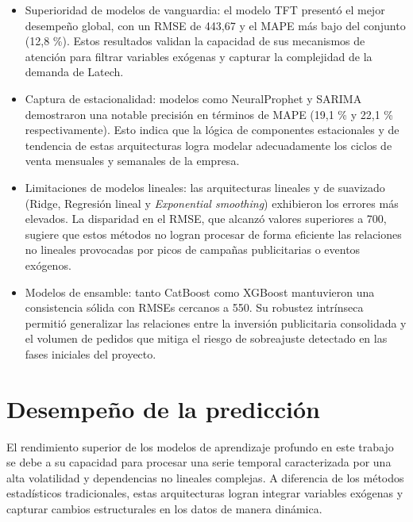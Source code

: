 \begin{itemize}

	\item Superioridad de modelos de vanguardia: el modelo TFT presentó el mejor desempeño global, con un RMSE de 443,67 y el MAPE más bajo del conjunto (12,8 \%). Estos resultados validan la capacidad de sus mecanismos de atención para filtrar variables exógenas y capturar la complejidad de la demanda de Latech.
	
	\item Captura de estacionalidad: modelos como NeuralProphet y SARIMA demostraron una notable precisión en términos de MAPE (19,1 \% y 22,1 \% respectivamente). Esto indica que la lógica de componentes estacionales y de tendencia de estas arquitecturas logra modelar adecuadamente los ciclos de venta mensuales y semanales de la empresa.
	
	\item Limitaciones de modelos lineales: las arquitecturas lineales y de suavizado (Ridge, Regresión lineal y \textit{Exponential smoothing}) exhibieron los errores más elevados. La disparidad en el RMSE, que alcanzó valores superiores a 700, sugiere que estos métodos no logran procesar de forma eficiente las relaciones no lineales provocadas por picos de campañas publicitarias o eventos exógenos.
	
	\item Modelos de ensamble: tanto CatBoost como XGBoost mantuvieron una consistencia sólida con RMSEs cercanos a 550. Su robustez intrínseca permitió generalizar las relaciones entre la inversión publicitaria consolidada y el volumen de pedidos que mitiga el riesgo de sobreajuste detectado en las fases iniciales del proyecto.

\end{itemize}




\section{Desempeño de la predicción}

El rendimiento superior de los modelos de aprendizaje profundo en este trabajo se debe a su capacidad para procesar una serie temporal caracterizada por una alta volatilidad y dependencias no lineales complejas. A diferencia de los métodos estadísticos tradicionales, estas arquitecturas logran integrar variables exógenas y capturar cambios estructurales en los datos de manera dinámica.

